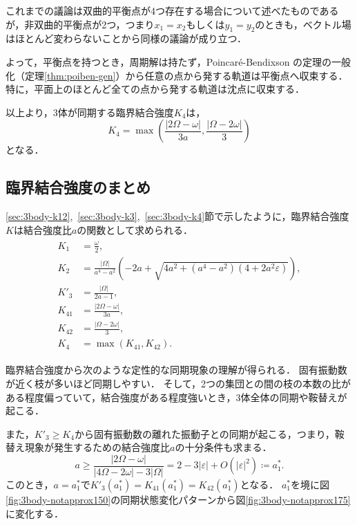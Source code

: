 \documentclass[../main]{subfiles}
\begin{document}
    これまでの議論は双曲的平衡点が4つ存在する場合について述べたものであるが，非双曲的平衡点が2つ，つまり$x_1=x_2$もしくは$y_1=y_2$のときも，ベクトル場はほとんど変わらないことから同様の議論が成り立つ．

    よって，平衡点を持つとき，周期解は持たず，Poincar\'{e}-Bendixson の定理の一般化（定理\ref{thm:poiben-gen}）から任意の点から発する軌道は平衡点へ収束する．
    特に，平面上のほとんど全ての点から発する軌道は沈点に収束する．

    以上より，3体が同期する臨界結合強度$K_4$は，
    \begin{equation}
        \label{eq:K4-approx}
        K_4=\max\left(\frac{|2\Omega-\omega|}{3a},\frac{|\Omega-2\omega|}{3}\right)
    \end{equation}
    となる．
    
    \subsection{臨界結合強度のまとめ}
    \label{sec:3body-summary}
    \ref{sec:3body-k12},\ \ref{sec:3body-k3},\ \ref{sec:3body-k4}節で示したように，臨界結合強度$K$は結合強度比$a$の関数として求められる．
    \begin{align}
        \label{eq:3body-matome}
        \begin{split}
            K_1&=\frac{\omega}{2},\\
            K_2&=\frac{|\Omega|}{a^4-a^2}\left(-2a+\sqrt{4a^2+(a^4-a^2)(4+2a^2\varepsilon)}\right),\\
            K'_3&=\frac{|\Omega|}{2a-1},\\
            K_{41}&=\frac{|2\Omega-\omega|}{3a},\\
            K_{42}&=\frac{|\Omega-2\omega|}{3},\\
            K_4&=\max\left(K_{41},K_{42}\right).
        \end{split}
    \end{align}

    臨界結合強度から次のような定性的な同期現象の理解が得られる．
    固有振動数が近く枝が多いほど同期しやすい．
    そして，2つの集団との間の枝の本数の比がある程度偏っていて，結合強度がある程度強いとき，3体全体の同期や鞍替えが起こる．
    
    また，$K'_3\geq K_4$から固有振動数の離れた振動子との同期が起こる，つまり，鞍替え現象が発生するための結合強度比$a$の十分条件も求まる．
    \begin{equation}
        \label{eq:a-ast1}
        a\geq \frac{|2\Omega-\omega|}{|4\Omega-2\omega|-3|\Omega|}= 2-3|\varepsilon|+O(|\varepsilon|^2)\coloneqq a^\ast_1.    
    \end{equation}
    このとき，$a=a^\ast_1$で$K'_{3}(a^\ast_1)=K_{41}(a^\ast_1)=K_{42}(a^\ast_1)$となる．
    $a^\ast_1$を境に図\ref{fig:3body-notapprox150}の同期状態変化パターンから図\ref{fig:3body-notapprox175}に変化する．
\end{document}
